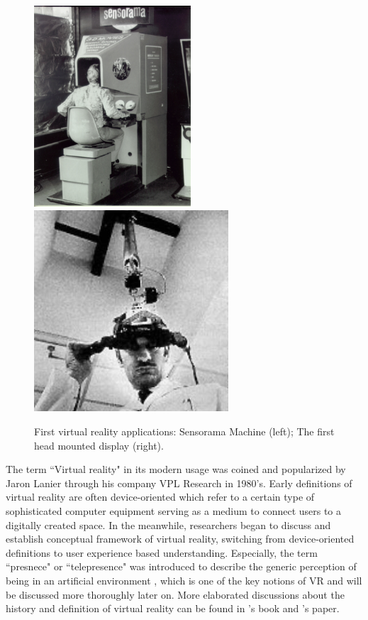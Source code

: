 \begin{figure}[htb]
  \centering
  \includegraphics[height=7.5cm]{figures/ch1/sensorama}
  \includegraphics[height=7.5cm]{figures/ch1/ultimateHMD}
  \caption{\label{fig:1_earlyapp}First virtual reality applications: Sensorama Machine (left); The first head mounted display (right).}
\end{figure}

The term ``Virtual reality" in its modern usage was coined and popularized by Jaron Lanier \citep{Lanier1992VR} through his company VPL Research in 1980's. Early definitions of virtual reality are often device-oriented which refer to a certain type of sophisticated computer equipment serving as a medium to connect users to a digitally created space. In the meanwhile, researchers began to discuss and establish conceptual framework of virtual reality, switching from device-oriented definitions to user experience based understanding. Especially, the term ``presnece" or ``telepresence" was introduced to describe the generic perception of being in an artificial environment \citep{Sheridan1992MTV}, which is one of the key notions of VR and will be discussed more thoroughly later on. More elaborated discussions about the history and definition of virtual reality can be found in \citet{Rheingold1991VR}'s book and \citet{Steuer1995Defining}'s paper.

